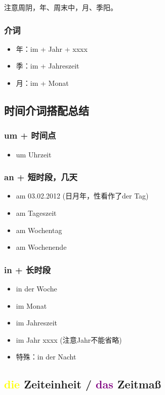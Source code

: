 注意周阴，年、周末中，月、季阳。 \\
\subsubsection{介词}
\begin{itemize}
    \item 年：im + Jahr + xxxx
    \item 季：im + Jahreszeit
    \item 月：im + Monat
\end{itemize}

\subsection{时间介词搭配总结}
\subsubsection{um + 时间点 \diam[border=true]}
\begin{itemize}
    \item um Uhrzeit
\end{itemize}
\label{time:prep:an}
\subsubsection{an + 短时段，几天 \olive[border=true]}
\begin{itemize}
    \item am 03.02.2012 (日月年，性看作了der Tag)
    \item am Tageszeit
    \item am Wochentag
    \item am Wochenende
\end{itemize}
\label{time:prep:in}
\subsubsection{in + 长时段 \olive[border=true]}
\begin{itemize}
    \item in der Woche
    \item im Monat
    \item im Jahreszeit
    \item im Jahr xxxx (注意Jahr不能省略)
    \item 特殊：in der Nacht
\end{itemize}

\subsection{\textcolor{yellow}{die} Zeiteinheit / \textcolor{purple}{das} Zeitmaß}


